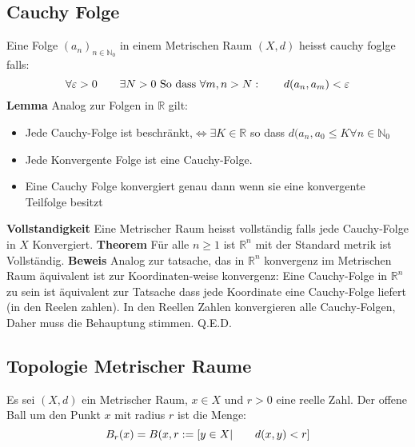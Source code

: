 \documentclass{article}
\newcommand{\mspc}{\hspace{0.7cm}}
\begin{document}
\subsection{Cauchy Folge}Eine Folge $(a_n)_{n\in\mathbb{N}_0}$ in einem Metrischen Raum $(X,d)$ heisst cauchy foglge falls:\[\forall \varepsilon >0 \mspc \exists N>0 \text{ So dass } \forall m,n >N: \mspc d(a_n,a_m)<\varepsilon\]
\textbf{Lemma} Analog zur Folgen in $\mathbb{R}$ gilt:
\begin{itemize}
\item{Jede Cauchy-Folge ist beschränkt,$\Leftrightarrow \exists K\in\mathbb{R}$ so dass $ d(a_n,a_0\le K \forall n\in \mathbb{N}_0$}
\item{Jede Konvergente Folge ist eine Cauchy-Folge.}
\item{Eine Cauchy Folge konvergiert genau dann wenn sie eine konvergente Teilfolge besitzt}
\end{itemize}
\textbf{Vollstandigkeit} Eine Metrischer Raum heisst vollständig falls jede Cauchy-Folge in $X$ Konvergiert.
\newline\textbf{Theorem} Für alle $n\ge1$ ist $\mathbb{R}^n$ mit der Standard metrik ist Vollständig.\newline
\textbf{Beweis} Analog zur tatsache, das in $\mathbb{R}^n$ konvergenz im Metrischen Raum äquivalent ist zur Koordinaten-weise konvergenz: Eine Cauchy-Folge in $\mathbb{R}^n$ zu sein ist äquivalent zur Tatsache dass jede Koordinate eine Cauchy-Folge liefert (in den Reelen zahlen).\newline
In den Reellen Zahlen konvergieren alle Cauchy-Folgen, Daher muss die Behauptung stimmen. Q.E.D.
\subsection{Topologie Metrischer Raume}
Es sei $(X,d)$ ein Metrischer Raum, $x\in X$ und $r>0$ eine reelle Zahl. Der offene Ball um den Punkt $x$ mit radius $r$ ist die Menge:\[B_r(x)=B(x,r:=\left[y\in X|\mspc d(x,y)<r\right]\]
\end{document}
